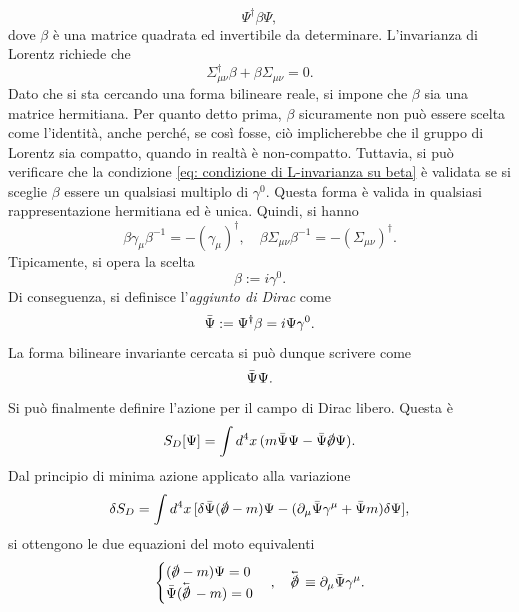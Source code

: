 \begin{equation}
    \Psi^\dag\beta\Psi,
\end{equation}
dove $\beta$ è una matrice quadrata ed invertibile da determinare. L'invarianza di Lorentz richiede che 
\begin{equation}
\label{eq: condizione di L-invarianza su beta}
    \Sigma_{\mu\nu}^\dag\beta + \beta\Sigma_{\mu\nu} = 0.
\end{equation}
Dato che si sta cercando una forma bilineare reale, si impone che $\beta$ sia una matrice hermitiana. Per quanto detto prima, $\beta$ sicuramente non può essere scelta come l'identità, anche perché, se così fosse, ciò implicherebbe che il gruppo di Lorentz sia compatto, quando in realtà è non-compatto. Tuttavia, si può verificare che la condizione \eqref{eq: condizione di L-invarianza su beta} è validata se si sceglie $\beta$ essere un qualsiasi multiplo di $\gamma^0$. Questa forma è valida in qualsiasi rappresentazione hermitiana ed è unica. Quindi, si hanno
\begin{equation}
    \beta\gamma_\mu\beta^{-1} = -(\gamma_\mu)^\dag,\quad \beta\Sigma_{\mu\nu}\beta^{-1} = -(\Sigma_{\mu\nu})^\dag.
\end{equation}
Tipicamente, si opera la scelta 
\begin{equation}
    \beta := i\gamma^0.
\end{equation}
Di conseguenza, si definisce l'\emph{aggiunto di Dirac} come 
\begin{equation}
\label{eq: aggiunto di Dirac}
    \bar{\Psi} := \Psi^\dag \beta = i\Psi \gamma^0.
\end{equation}
La forma bilineare invariante cercata si può dunque scrivere come 
\begin{equation}
    \bar{\Psi}\Psi.
\end{equation}
Si può finalmente definire l'azione per il campo di Dirac libero. Questa è
\begin{equation}
    S_D[\Psi] = \int d^4x\,(m\b{\Psi}\Psi - \b{\Psi}\sl{\p}\Psi).
\end{equation}
Dal principio di minima azione applicato alla variazione 
\begin{equation}
    \delta S_D = \int d^4x\,[\delta\b{\Psi}(\sl{\p} - m)\Psi - (\p_\mu\b{\Psi}\gamma^\mu + \b{\Psi}m)\delta\Psi],
\end{equation}
si ottengono le due equazioni del moto equivalenti
\begin{equation}
    \begin{cases}
        (\sl{\p} - m)\Psi = 0 \\
        \b{\Psi}(\backv{\sl{\p}} - m) = 0
    \end{cases},\quad \backv{\sl{\p}} \equiv \p_\mu\b{\Psi}\gamma^\mu.
\end{equation}

